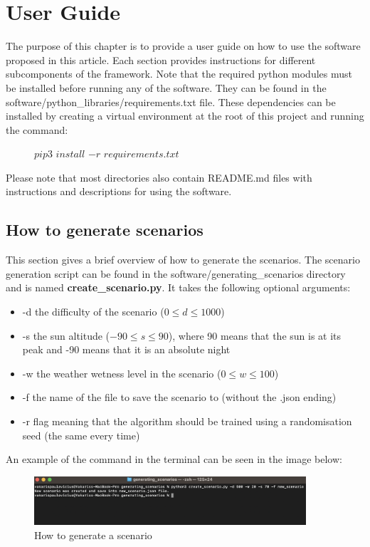 \chapter{User Guide} \label{chap:b}
The purpose of this chapter is to provide a user guide on how to use the software proposed in this article. Each section provides instructions for different subcomponents of the framework. Note that the required python modules must be installed before running any of the software. They can be found in the software/python\_libraries/requirements.txt file. These dependencies can be installed by creating a virtual environment at the root of this project and running the command:
\begin{figure} [h]
    \centering
    $pip3$ $install$ $-r$ $requirements.txt$
\end{figure}

Please note that most directories also contain README.md files with instructions and descriptions for using the software.

\section{How to generate scenarios} \label{sect:b.1}
This section gives a brief overview of how to generate the scenarios. The scenario generation script can be found in the software/generating\_scenarios directory and is named \textbf{create\_scenario.py}. It takes the following optional arguments:

\begin{itemize}
  \item -d the difficulty of the scenario ($0 \leq d \leq 1000$)
  \item -s the sun altitude ($-90 \leq s \leq 90$), where 90 means that the sun is at its peak and -90 means that it is an absolute night
  \item -w the weather wetness level in the scenario ($0 \leq w \leq 100$)
  \item -f the name of the file to save the scenario to (without the .json ending)
  \item -r flag meaning that the algorithm should be trained using a randomisation seed (the same every time)
\end{itemize}

An example of the command in the terminal can be seen in the image below:

\begin{figure} [h]
    \centering
    \includegraphics[width = 0.9\textwidth]{research_paper/Images/create_scenario.png}
    \caption{How to generate a scenario}
\end{figure}

